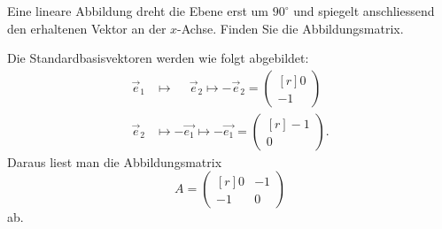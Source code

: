 Eine lineare Abbildung dreht die Ebene erst um $90^\circ$ und spiegelt
anschliessend den erhaltenen Vektor an der $x$-Achse.
Finden Sie die Abbildungsmatrix.

\begin{loesung}
Die Standardbasisvektoren werden wie folgt abgebildet:
\begin{align*}
\vec{e}_1
&\mapsto
\phantom{-}
\vec{e}_2
\mapsto
-\vec{e}_2
=
\begin{pmatrix*}[r]0\\-1\end{pmatrix*}
\\
\vec{e}_2
&\mapsto
-\vec{e_1}
\mapsto
-\vec{e_1}
=
\begin{pmatrix*}[r] -1\\0 \end{pmatrix*}.
\end{align*}
Daraus liest man die Abbildungsmatrix
\[
A
=
\begin{pmatrix*}[r]
 0 & -1\\
-1 &  0
\end{pmatrix*}
\]
ab.
\end{loesung}


